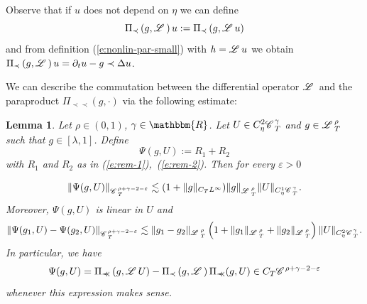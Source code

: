 \documentclass{amsart}
\newcommand{\assign}{:=}
\newcommand{\cdummy}{\cdot}
\newcommand{\precprec}{\prec\!\!\!\prec}
\newtheorem{lemma}[theorem]{Lemma}
\theoremstyle{remark}
\theoremstyle{definition}
\newcommand{\CC}{\mathscr{C} \hspace{.1em}}
\newcommand{\LL}{\mathscr{L} \hspace{.2em}}
\begin{document}
Observe that if $u$ does not depend on $\eta$ we can define
\begin{equation}
  \Pi_{\prec} \left( g, \LL \right) u \assign \Pi_{\prec} \left( g, \LL u
  \right)  \label{e:paradiff-oper}
\end{equation}
and from definition (\ref{e:nonlin-par-small}) with $h = \LL u$ we obtain
$\Pi_{\prec} \left( g, \LL \right) u = \partial_t u - g \prec \Delta u$.

We can describe the commutation between the differential operator $\LL$ and
the paraproduct $\Pi_{\precprec} (g, \cdummy)$ via the following estimate:

\begin{lemma}
  \label{l:def-psi}Let $\rho \in (0, 1)$, $\gamma \in \mathbbm{R}$. Let $U \in
  C_{\eta}^2 \CC^{\gamma}_T$ and $g \in \LL^{\rho}_T$ such that $g \in
  [\lambda, 1]$. Define
  \[ \Psi (g, U) \assign R_1 + R_2 \]
  with $R_1$ and $R_2$ as in (\ref{e:rem-1}),~(\ref{e:rem-2}). Then for every
  $\varepsilon > 0$
  
  
  \begin{equation}
    \| \Psi (g, U) \|_{\CC_T^{\rho + \gamma - 2 - \varepsilon}} \lesssim (1 +
    \| g \|_{C_T L^{\infty}}) \| g \|_{\LL^{\rho}_T}^{} \| U \|_{C_{\eta}^1
    \CC^{\gamma}_{_T}}  \label{e:psi-est} .
  \end{equation}
  Moreover, $\Psi (g, U)$ is linear in $U$ and
  \[ \| \Psi (g_1, U) - \Psi (g_2, U) \|_{\CC_T^{\rho + \gamma - 2 -
     \varepsilon}} \lesssim \| g_1 - g_2 \|_{\LL^{\rho}_T} \left( 1 + \| g_1
     \|_{\LL^{\rho}_T} + \| g_2 \|_{\LL^{\rho}_T} \right) \| U \|_{C_{\eta}^2
     \CC^{\gamma}_{_T}} . \]
  In particular, we have
  \begin{equation}
    \Psi (g, U) = \Pi_{\precprec} \left( g, \LL U \right) - \Pi_{\prec} \left(
    g, \LL \right) \Pi_{\precprec} (g, U) \in C_T \CC^{\rho + \gamma - 2 -
    \varepsilon}  \label{e:quasidef-psi}
  \end{equation}
  whenever this expression makes sense.
\end{lemma}
\end{document}
